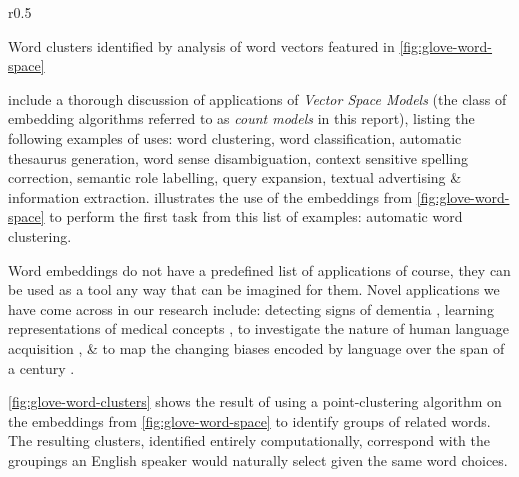 \documentclass{ucetd}
\begin{document}
\par
\begin{figurewrap}[10]{r}{0.5\textwidth}
  \vspace{-3.5em}
  \captionsetup{width=.4\textwidth}
  \centering
  
  \caption{Word clusters identified by analysis of word vectors featured in \autoref{fig:glove-word-space}}\label{fig:glove-word-clusters}
  \vspace{-10em}
\end{figurewrap}
\par
\textcite{turney10-from-frequen-to-meanin} include a thorough discussion of applications of \emph{Vector Space Models} (the class of embedding algorithms referred to as \emph{count models} in this report), listing the following examples of uses: word clustering, word classification, automatic thesaurus generation, word sense disambiguation, context sensitive spelling correction, semantic role labelling, query expansion, textual advertising \& information extraction.  illustrates the use of the embeddings from \autoref{fig:glove-word-space} to perform the first task from this list of examples: automatic word clustering.

Word embeddings do not have a predefined list of applications of course, they can be used as a tool any way that can be imagined for them. Novel applications we have come across in our research include: detecting signs of dementia \parencite{mirheidari-2018-detecting-signs-of-dementia}, learning representations of medical concepts \parencite{ChoiChiuSon-amia16}, to investigate the nature of human language acquisition \parencite{landauer-1997-a-solution}, \& to map the changing biases encoded by language over the span of a century \parencite{garg-2018-word-embeddings-quantify}.

\begin{example}\label{ex:glove-word-clusters}
  \autoref{fig:glove-word-clusters} shows the result of using a point-clustering algorithm on the embeddings from \autoref{fig:glove-word-space} to identify groups of related words. The resulting clusters, identified entirely computationally, correspond with the groupings an English speaker would naturally select given the same word choices.
\end{example}
\end{document}
